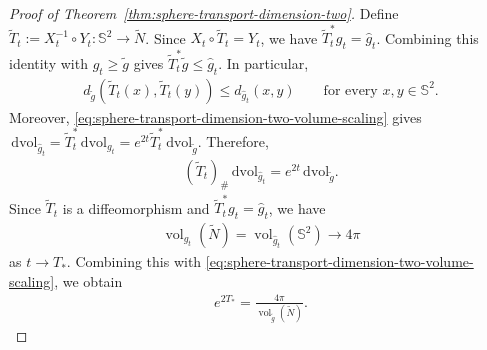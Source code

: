 \documentclass[11pt,reqno]{amsart}
\numberwithin{equation}{section}
\theoremstyle{definition}
\theoremstyle{remark}
\def\bS {\mathbb{S}}
\newcommand{\0}{\emptyset}
\newcommand{\vol}{\operatorname{vol}}
\newcommand{\dvol}{\,\mathrm{dvol}}
\begin{document}
\begin{proof}[Proof of Theorem~\ref{thm:sphere-transport-dimension-two}]
Define $\widetilde T_t:=X_t^{-1}\circ Y_t:\bS^2\to\widetilde N$. Since
$X_t\circ\widetilde T_t=Y_t$, we have
$\widetilde T_t^*g_t=\widehat g_t$. Combining this identity with
$g_t\geq\widetilde g$ gives
$\widetilde T_t^*\widetilde g\leq\widehat g_t$. In particular,
\begin{align}\label{eq:sphere-transport-dimension-two-Tt-distance}
        d_{\widetilde g}(\widetilde T_t(x),\widetilde T_t(y))
        \leq
        d_{\widehat g_t}(x,y)
        \qquad
        \text{for every }x,y\in\bS^2.
\end{align}
Moreover, \eqref{eq:sphere-transport-dimension-two-volume-scaling} gives
$\dvol_{\widehat g_t}=\widetilde T_t^*\dvol_{g_t}
=e^{2t}\widetilde T_t^*\dvol_{\widetilde g}$. Therefore,
\begin{align}\label{eq:sphere-transport-dimension-two-Tt-pushforward}
        (\widetilde T_t)_\#\dvol_{\widehat g_t}
        =
        e^{2t}\dvol_{\widetilde g}.
\end{align}
Since $\widetilde T_t$ is a diffeomorphism and
$\widetilde T_t^*g_t=\widehat g_t$, we have
\begin{align}
        \vol_{g_t}(\widetilde N)
        =
        \vol_{\widehat g_t}(\bS^2)
        \rightarrow
        4\pi
\end{align}
as $t\to T_*$. Combining this with
\eqref{eq:sphere-transport-dimension-two-volume-scaling}, we obtain
\begin{align}\label{eq:sphere-transport-dimension-two-terminal-factor}
        e^{2T_*}
        =
        \frac{4\pi}{\vol_{\widetilde g}(\widetilde N)}.
\end{align}


\end{proof}
\end{document}
